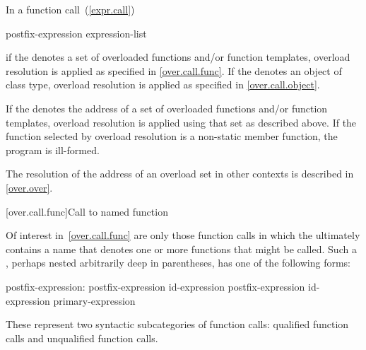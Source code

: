 \pnum
In a function call~(\ref{expr.call})

\begin{ncsimplebnf}
postfix-expression \terminal{(} expression-list\opt{} \terminal{)}
\end{ncsimplebnf}

if the  denotes a set of overloaded functions and/or
function templates, overload resolution is applied as specified in \ref{over.call.func}.
If the  denotes an object of class type, overload
resolution is applied as specified in \ref{over.call.object}.

\pnum
If the  denotes the address of a set of overloaded
functions and/or function templates, overload resolution is applied using that set as
described above. If the function selected by overload resolution is a non-static member
function, the program is ill-formed. \begin{note} The resolution of the address of an
overload set in other contexts is described in \ref{over.over}. \end{note}

[over.call.func]{Call to named function}

\pnum
Of interest in~\ref{over.call.func} are only those function calls in
which the
ultimately contains a name that
denotes one or more functions that might be called.
Such a
,
perhaps nested arbitrarily deep in
parentheses, has one of the following forms:

\begin{ncbnf}
postfix-expression:\br
    postfix-expression  id-expression\br
    postfix-expression \terminal{->} id-expression\br
    primary-expression
\end{ncbnf}

These represent two syntactic subcategories of function calls:
qualified function calls and unqualified function calls.

